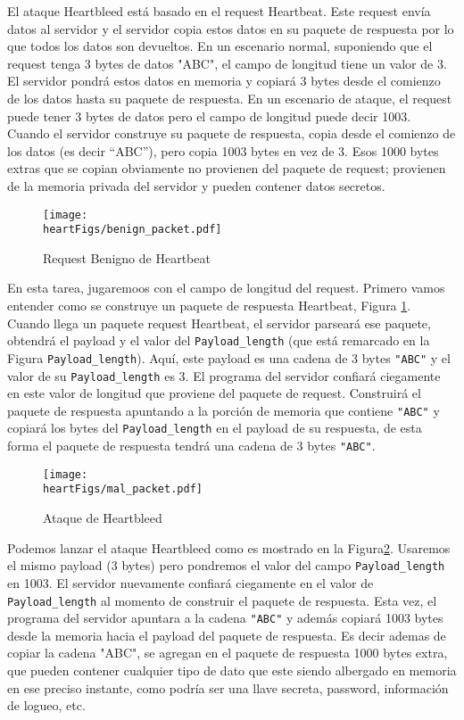 El ataque Heartbleed está basado en el request Heartbeat. Este request envía datos al servidor y el servidor copia estos datos en su paquete de respuesta por lo que todos los datos son devueltos. 
En un escenario normal, suponiendo que el request tenga 3 bytes de datos "ABC", el campo de longitud tiene un valor de 3. El servidor pondrá estos datos en memoria y copiará 3 bytes desde el comienzo de los datos hasta su paquete de respuesta.
En un escenario de ataque, el request puede tener 3 bytes de datos pero el campo de longitud puede decir 1003. Cuando el servidor construye su paquete de respuesta, copia desde el comienzo de los datos (es decir ``ABC''), pero copia 1003 bytes en vez de 3.
Esos 1000 bytes extras que se copian obviamente no provienen del paquete de request; provienen de la memoria privada del servidor y pueden contener datos secretos.


\begin{figure}[htb]
\centering
\texttt{[image: \\heartFigs/benign\_packet.pdf]}
\caption{Request Benigno de Heartbeat} 
\label{fig:benign_packet}
\end{figure}

En esta tarea, jugaremoos con el campo de longitud del request.
Primero vamos entender como se construye un paquete de respuesta Heartbeat, Figura \ref{fig:benign_packet}. Cuando llega un paquete request Heartbeat, el servidor parseará ese paquete, obtendrá el payload y el valor del \texttt{Payload\_length} (que está remarcado en la Figura \texttt{Payload\_length}). Aquí, este payload es una cadena de 3 bytes \texttt{"ABC"} y el valor de su \texttt{Payload\_length} es 3. El programa del servidor confiará ciegamente en este valor de longitud que proviene del paquete de request. Construirá el paquete de respuesta apuntando a la porción de memoria que contiene \texttt{"ABC"} y copiará los bytes del \texttt{Payload\_length} en el payload de su respuesta, de esta forma el paquete de respuesta tendrá una cadena de 3 bytes  \texttt{"ABC"}.

\begin{figure}[!htb]
\centering
\texttt{[image: \\heartFigs/mal\_packet.pdf]}
\caption{Ataque de Heartbleed} 
\label{fig:mal_packet}
\end{figure}

Podemos lanzar el ataque Heartbleed como es mostrado en la Figura\ref{fig:mal_packet}. Usaremos el mismo payload (3 bytes) pero pondremos el valor del campo \texttt{Payload\_length} en 1003. El servidor nuevamente confiará ciegamente en el valor de \texttt{Payload\_length} al momento de construir el paquete de respuesta. Esta vez, el programa del servidor apuntara a la cadena \texttt{"ABC"} y además copiará 1003 bytes desde la memoria hacia el payload del  paquete de respuesta. Es decir ademas de copiar la cadena "ABC", se agregan en el paquete de respuesta 1000 bytes extra, que pueden contener cualquier tipo de dato que este siendo albergado en memoria en ese preciso instante, como podría ser una llave secreta, password, información de logueo, etc.

